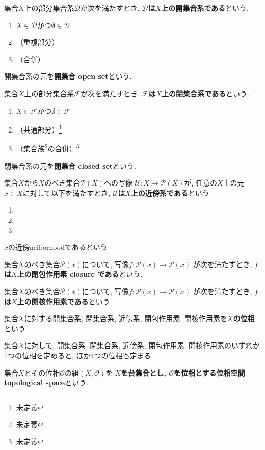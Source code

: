 \begin{Def}
集合$X$上の部分集合系$\mathscr{D}$が次を満たすとき, {\bf$\mathscr{D}$は$X$上の開集合系である}という.
\begin{enumerate}
\item $X\in\mathscr{D}$かつ$\emptyset\in\mathscr{D}$
\item （重複部分）
\item （合併）
\end{enumerate}
\end{Def}
\begin{Def}
開集合系の元を{\bf 開集合 open set}という.
\end{Def}
\begin{Def}
集合$X$上の部分集合系$\mathcal{F}$が次を満たすとき, {\bf$\mathscr{F}$は$X$上の閉集合系である}という.
\begin{enumerate}
\item $X\in\mathscr{F}$かつ$\emptyset\in\mathscr{F}$
\item （共通部分）\footnote{未定義}
\item （集合族\footnote{未定義}の合併）\footnote{未定義}
\end{enumerate}
\end{Def}
\begin{Def}
閉集合系の元を{\bf 閉集合 closed set}という.
\end{Def}
\begin{Def}
集合$X$から$X$のべき集合$\mathscr{P}(X)$への写像
$\mathscr{U}:X\rightarrow\mathscr{P}(X)$が, 任意の$X$上の元$x\in X$に対して以下を満たすとき,
{\bf $\mathscr{U}$は$X$上の近傍系である}という
\begin{enumerate}
\item
\item
\item
\end{enumerate}
\end{Def}
\begin{Def}
$x$の近傍neiborhoodであるという
\end{Def}
\begin{Def}
集合$X$のべき集合$\mathscr{P}(x)$について, 写像$f:\mathscr{P}(x)\rightarrow\mathscr{P}(x)$
が次を満たすとき,
{\bf $f$は$X$上の閉包作用素 closure である}という.
\end{Def}
\begin{Def}
集合$X$のべき集合$\mathscr{P}(x)$について, 写像$f:\mathscr{P}(x)\rightarrow\mathscr{P}(x)$
が次を満たすとき,
{\bf $f$は$X$上の開核作用素である}という.
\end{Def}
\begin{Def}
集合$X$に対する開集合系, 閉集合系, 近傍系, 閉包作用素, 開核作用素を{\bf $X$の位相}という
\end{Def}
\begin{Prop}
集合$X$に対して, 開集合系, 閉集合系, 近傍系, 閉包作用素, 開核作用素のいずれか1つの位相を定めると, ほか4つの位相も定まる. 
\end{Prop}
\begin{Def}
集合$X$とその位相$\mathcal{O}$の組$(X,\mathcal{O})$を
{\bf $X$を台集合とし, $\mathcal{O}$を位相とする位相空間 topological space}という.
\end{Def}

